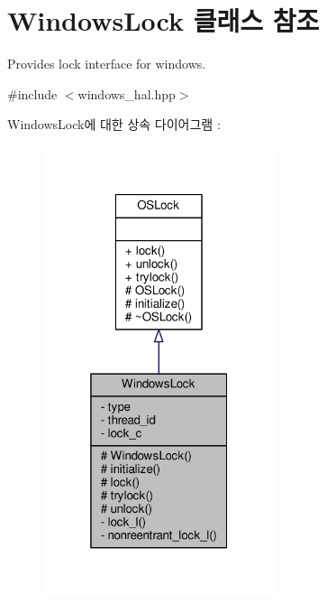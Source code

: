 \hypertarget{class_windows_lock}{}\section{Windows\+Lock 클래스 참조}
\label{class_windows_lock}


Provides lock interface for windows.  




{\ttfamily \#include $<$windows\+\_\+hal.\+hpp$>$}



Windows\+Lock에 대한 상속 다이어그램 \+: 
\nopagebreak
\begin{figure}[H]
\begin{center}
\leavevmode
\includegraphics[width=193pt]{class_windows_lock__inherit__graph}
\end{center}
\end{figure}


